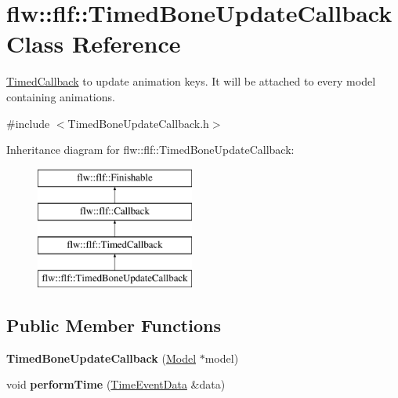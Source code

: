 \hypertarget{classflw_1_1flf_1_1TimedBoneUpdateCallback}{}\section{flw\+:\+:flf\+:\+:Timed\+Bone\+Update\+Callback Class Reference}
\label{classflw_1_1flf_1_1TimedBoneUpdateCallback}


\hyperlink{classflw_1_1flf_1_1TimedCallback}{Timed\+Callback} to update animation keys. It will be attached to every model containing animations.  




{\ttfamily \#include $<$Timed\+Bone\+Update\+Callback.\+h$>$}

Inheritance diagram for flw\+:\+:flf\+:\+:Timed\+Bone\+Update\+Callback\+:\begin{figure}[H]
\begin{center}
\leavevmode
\includegraphics[height=4.000000cm]{classflw_1_1flf_1_1TimedBoneUpdateCallback}
\end{center}
\end{figure}
\subsection*{Public Member Functions}
\begin{DoxyCompactItemize}
\item 
{\bfseries Timed\+Bone\+Update\+Callback} (\hyperlink{classflw_1_1flf_1_1Model}{Model} $\ast$model)\hypertarget{classflw_1_1flf_1_1TimedBoneUpdateCallback_a963950c379268306ef09f9c27a2f6120}{}\label{classflw_1_1flf_1_1TimedBoneUpdateCallback_a963950c379268306ef09f9c27a2f6120}

\item 
void {\bfseries perform\+Time} (\hyperlink{structflw_1_1flf_1_1TimeEventData}{Time\+Event\+Data} \&data)\hypertarget{classflw_1_1flf_1_1TimedBoneUpdateCallback_ad99b1222a5038c160ccf5aa0aa2262f9}{}\label{classflw_1_1flf_1_1TimedBoneUpdateCallback_ad99b1222a5038c160ccf5aa0aa2262f9}

\end{DoxyCompactItemize}
